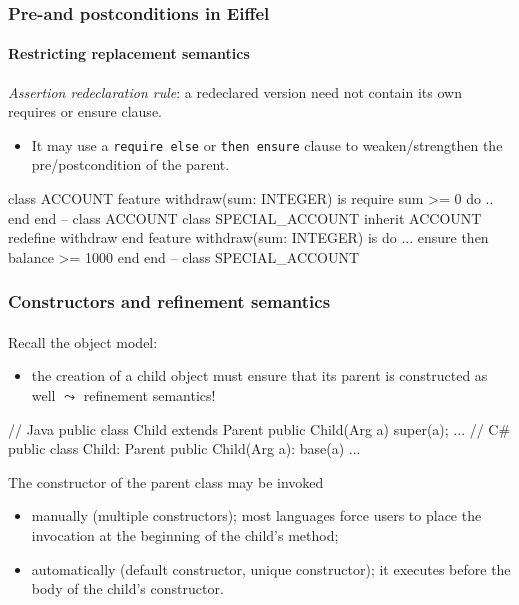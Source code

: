 \documentclass{beamer}
\begin{document}
\begin{frame}[fragile]
\frametitle{Pre-and postconditions in Eiffel}
\framesubtitle{Restricting replacement semantics}
\textit{Assertion redeclaration rule}: a redeclared version need not contain its own requires or ensure
clause.
\begin{itemize}
\item It may use a \texttt{require else} or
\texttt{then ensure} clause
to weaken/strengthen the pre/postcondition of the parent. 

\end{itemize}
\begin{eiffel}
class ACCOUNT 
feature
   withdraw(sum: INTEGER) is
       require
           sum >= 0
       do ..  end
end -- class ACCOUNT
class SPECIAL_ACCOUNT inherit
      ACCOUNT
      redefine withdraw end
feature
       withdraw(sum: INTEGER) is
       do ...
       ensure then
           balance >= 1000
       end
end -- class SPECIAL_ACCOUNT       
\end{eiffel}
\end{frame}

\begin{frame}[fragile]
\frametitle{Constructors and refinement semantics}
\framesubtitle{}
Recall the object model: 
\begin{itemize}
\item
the creation of a child object must ensure that its parent is
constructed as well $\leadsto$ refinement semantics!
\end{itemize}

\begin{cplus3}
// Java 
public class Child extends Parent {
   public Child(Arg a) { super(a); ... }
} 
// C#
public class Child: Parent {
   public Child(Arg a): base(a) {...}
}
\end{cplus3}

The constructor of the parent class may be invoked 
\begin{itemize}
\item manually  (multiple constructors); most languages force
users to place the invocation at the beginning
of the child's method;
\item automatically (default constructor, unique constructor);
it executes before the body of the child's constructor.

\end{itemize}


\end{frame}
\end{document}
